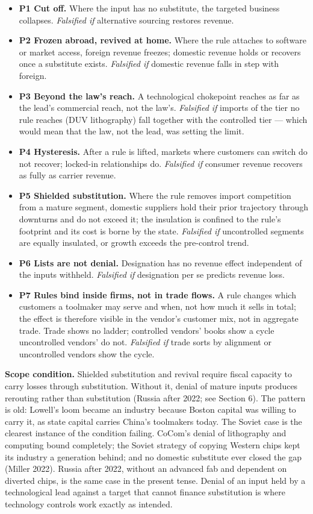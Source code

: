\documentclass[12pt]{article}
\providecommand{\tightlist}{\setlength{\itemsep}{0pt}\setlength{\parskip}{0pt}}\newcommand{\passthrough}[1]{#1}\setlength{\parskip}{4pt}\emergencystretch=2.5em\hyphenpenalty=200\tolerance=2000
\begin{document}
\begin{itemize}
\tightlist
\item
  \textbf{P1 Cut off.} Where the input has no substitute, the targeted business collapses. \emph{Falsified if} alternative sourcing restores revenue.
\item
  \textbf{P2 Frozen abroad, revived at home.} Where the rule attaches to software or market access, foreign revenue freezes; domestic revenue holds or recovers once a substitute exists. \emph{Falsified if} domestic revenue falls in step with foreign.
\item
  \textbf{P3 Beyond the law's reach.} A technological chokepoint reaches as far as the lead's commercial reach, not the law's. \emph{Falsified if} imports of the tier no rule reaches (DUV lithography) fall together with the controlled tier --- which would mean that the law, not the lead, was setting the limit.
\item
  \textbf{P4 Hysteresis.} After a rule is lifted, markets where customers can switch do not recover; locked-in relationships do. \emph{Falsified if} consumer revenue recovers as fully as carrier revenue.
\item
  \textbf{P5 Shielded substitution.} Where the rule removes import competition from a mature segment, domestic suppliers hold their prior trajectory through downturns and do not exceed it; the insulation is confined to the rule's footprint and its cost is borne by the state. \emph{Falsified if} uncontrolled segments are equally insulated, or growth exceeds the pre-control trend.
\item
  \textbf{P6 Lists are not denial.} Designation has no revenue effect independent of the inputs withheld. \emph{Falsified if} designation per se predicts revenue loss.
\item
  \textbf{P7 Rules bind inside firms, not in trade flows.} A rule changes which customers a toolmaker may serve and when, not how much it sells in total; the effect is therefore visible in the vendor's customer mix, not in aggregate trade. Trade shows no ladder; controlled vendors' books show a cycle uncontrolled vendors' do not. \emph{Falsified if} trade sorts by alignment or uncontrolled vendors show the cycle.
\end{itemize}

\textbf{Scope condition.} Shielded substitution and revival require fiscal capacity to carry losses through substitution. Without it, denial of mature inputs produces rerouting rather than substitution (Russia after 2022; see Section 6). The pattern is old: Lowell's loom became an industry because Boston capital was willing to carry it, as state capital carries China's toolmakers today. The Soviet case is the clearest instance of the condition failing. CoCom's denial of lithography and computing bound completely; the Soviet strategy of copying Western chips kept its industry a generation behind; and no domestic substitute ever closed the gap (Miller 2022). Russia after 2022, without an advanced fab and dependent on diverted chips, is the same case in the present tense. Denial of an input held by a technological lead against a target that cannot finance substitution is where technology controls work exactly as intended.
\end{document}
